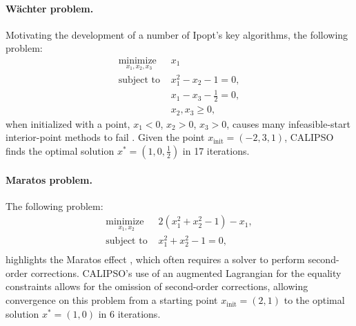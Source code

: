 \paragraph{W\"{a}chter problem.}
Motivating the development of a number of Ipopt's key algorithms, the following problem:
\begin{equation}
	\begin{array}{ll}
		\underset{x_1, x_2, x_3}{\mbox{minimize }}  & x_1\\
		\mbox{subject to } & x_1^2 - x_2 - 1 = 0, \\
		& x_1 - x_3 - \frac{1}{2} = 0, \\
		& x_2, x_3 \geq 0,
	\end{array}
	\label{wachter_problem}
\end{equation}
when initialized with a point, $x_1 < 0$, $x_2 > 0$, $x_3 > 0$, causes many infeasible-start interior-point methods to fail \cite{hinder2018one}. Given the point $x_{\mbox{init}} = (-2, 3, 1)$, CALIPSO finds the optimal solution $x^* = (1, 0, \frac{1}{2})$ in 17 iterations.

\paragraph{Maratos problem.}
The following problem: 
\begin{equation}
	\begin{array}{ll}
		\underset{x_1, x_2}{\mbox{minimize }}  & 2 (x_1^2 + x_2^2 - 1) - x_1,\\
		\mbox{subject to } & x_1^2 + x_2^2 - 1 = 0, \\
	\end{array}
	\label{maratos_problem}
\end{equation}
highlights the Maratos effect \cite{nocedal2006numerical}, which often requires a solver to perform second-order corrections. CALIPSO's use of an augmented Lagrangian for the equality constraints allows for the omission of second-order corrections, allowing convergence on this problem from a starting point $x_{\mbox{init}} = (2, 1)$ to the optimal solution $x^* = (1, 0)$ in 6 iterations.


